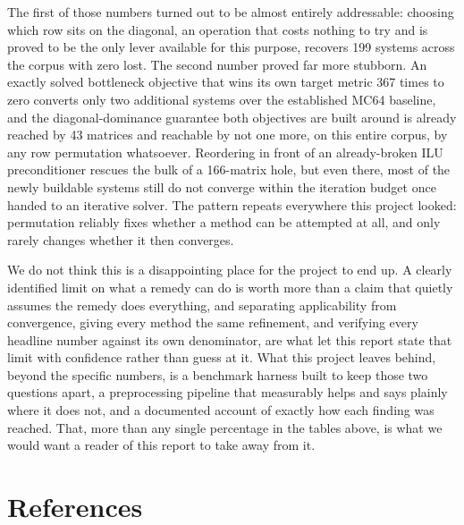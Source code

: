 \documentclass[11pt,a4paper]{article}
\begin{document}
The first of those numbers turned out to be almost entirely addressable: choosing which
row sits on the diagonal, an operation that costs nothing to try and is proved to be the
only lever available for this purpose, recovers 199 systems across the corpus with zero
lost. The second number proved far more stubborn. An exactly solved bottleneck objective
that wins its own target metric 367 times to zero converts only two additional systems
over the established MC64 baseline, and the diagonal-dominance guarantee both objectives
are built around is already reached by 43 matrices and reachable by not one more, on this
entire corpus, by any row permutation whatsoever. Reordering in front of an already-broken
ILU preconditioner rescues the bulk of a 166-matrix hole, but even there, most of the
newly buildable systems still do not converge within the iteration budget once handed to
an iterative solver. The pattern repeats everywhere this project looked: permutation
reliably fixes whether a method can be attempted at all, and only rarely changes whether it
then converges.

We do not think this is a disappointing place for the project to end up. A clearly
identified limit on what a remedy can do is worth more than a claim that quietly assumes
the remedy does everything, and separating applicability from convergence, giving every
method the same refinement, and verifying every headline number against its own
denominator, are what let this report state that limit with confidence rather than guess
at it. What this project leaves behind, beyond the specific numbers, is a benchmark
harness built to keep those two questions apart, a preprocessing pipeline that measurably
helps and says plainly where it does not, and a documented account of exactly how each
finding was reached. That, more than any single percentage in the tables above, is what we
would want a reader of this report to take away from it.

\clearpage
\section*{References}
\end{document}
